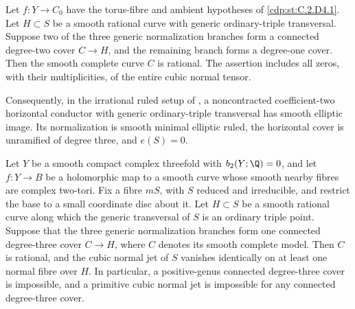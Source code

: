 
\begin{proposition}\hypertarget{tag-01BX}{}\label{cdp:st:C.2.D4.2}


Let $f:Y\to C_0$ have the torus-fibre and ambient hypotheses
of \ref{cdp:st:C.2.D4.1}. Let $H\subset S$ be a smooth rational curve
with generic ordinary-triple transversal. Suppose two of
the three generic normalization branches form a connected
degree-two cover $C\to H$, and the remaining branch forms
a degree-one cover. Then the smooth complete curve $C$
is rational. The assertion includes all zeros, with their
multiplicities, of the entire cubic normal tensor.

Consequently, in the irrational ruled setup of ,
a noncontracted coefficient-two horizontal conductor
with generic ordinary-triple transversal has smooth
elliptic image. Its normalization is smooth minimal
elliptic ruled, the horizontal cover is unramified of
degree three, and $e(S)=0$.
\end{proposition}

\begin{proposition}\hypertarget{tag-01BW}{}\label{cdp:st:C.2.D4.1}


Let $Y$ be a smooth compact complex threefold with
$b_2(Y;\Q)=0$, and let $f:Y\to B$ be a holomorphic map to a
smooth curve whose smooth nearby fibres are complex two-tori.
Fix a fibre $mS$, with $S$ reduced and irreducible, and restrict
the base to a small coordinate disc about it. Let
$H\subset S$ be a smooth rational curve along which the generic
transversal of $S$ is an ordinary triple point. Suppose that the
three generic normalization branches form one connected degree-three
cover $C\to H$, where $C$ denotes its smooth complete model.
Then $C$ is rational, and the cubic normal jet of $S$ vanishes
identically on at least one normal fibre over $H$.
In particular, a positive-genus connected degree-three cover is
impossible, and a primitive cubic normal jet is impossible for
any connected degree-three cover.
\end{proposition}

